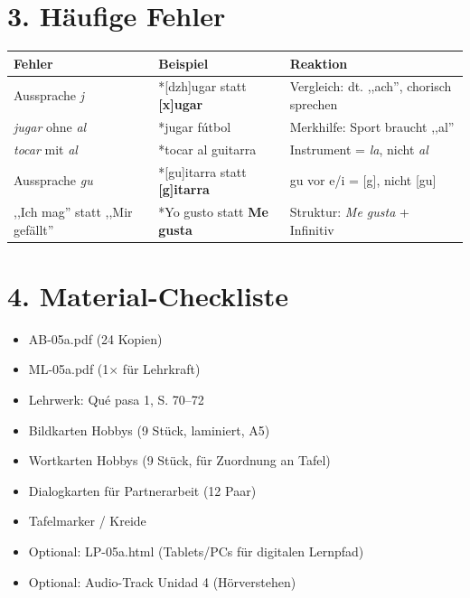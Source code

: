 \documentclass[11pt, a4paper]{article}
\newcommand{\fachfarbe}{spanisch}
\newcommand{\sequenz}{05}
\newcommand{\block}{a}
\newcommand{\lerngruppengroesse}{24}
\newcommand{\es}[1]{\textcolor{\fachfarbe}{\textbf{#1}}}
\begin{document}

\section*{3. Häufige Fehler}

\begin{fehlerbox}
\begin{tabularx}{\textwidth}{|l|X|X|}
\hline
\textbf{Fehler} & \textbf{Beispiel} & \textbf{Reaktion} \\
\hline
Aussprache \textit{j} & *[dzh]ugar statt \es{[x]ugar} & Vergleich: dt. ,,ach'', chorisch sprechen \\
\hline
\textit{jugar} ohne \textit{al} & *jugar fútbol & Merkhilfe: Sport braucht ,,al'' \\
\hline
\textit{tocar} mit \textit{al} & *tocar al guitarra & Instrument = \textit{la}, nicht \textit{al} \\
\hline
Aussprache \textit{gu} & *[gu]itarra statt \es{[g]itarra} & gu vor e/i = [g], nicht [gu] \\
\hline
,,Ich mag'' statt ,,Mir gefällt'' & *Yo gusto statt \es{Me gusta} & Struktur: \textit{Me gusta} + Infinitiv \\
\hline
\end{tabularx}
\end{fehlerbox}


\section*{4. Material-Checkliste}

\begin{materialbox}
\begin{itemize}[label=$\square$]
    \item AB-\sequenz\block.pdf (\lerngruppengroesse{} Kopien)
    \item ML-\sequenz\block.pdf (1$\times$ für Lehrkraft)
    \item Lehrwerk: Qué pasa 1, S. 70--72
    \item Bildkarten Hobbys (9 Stück, laminiert, A5)
    \item Wortkarten Hobbys (9 Stück, für Zuordnung an Tafel)
    \item Dialogkarten für Partnerarbeit (12 Paar)
    \item Tafelmarker / Kreide
    \item Optional: LP-\sequenz\block.html (Tablets/PCs für digitalen Lernpfad)
    \item Optional: Audio-Track Unidad 4 (Hörverstehen)
\end{itemize}
\end{materialbox}
\end{document}
